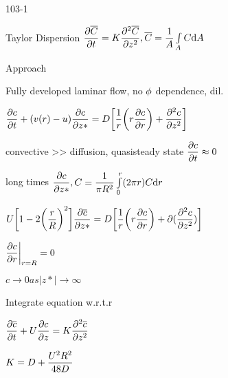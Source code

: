 \begin{mitframe}{103-1}
\begin{listone}
\item Taylor Dispersion  $\dfrac{\partial\overline{\conc}}{\partial\timet}=\dilfac\dfrac{\partial^2\overline{\conc}}{\partial{z}^2}, \overline{\conc}=\dfrac{1}{\helmholtz}\int\limits_{\helmholtz}\conc\mathrm{d}\helmholtz$
\item Approach
		\begin{listtwo}
        	\item Fully developed laminar flow, no $\eleccoeff$ dependence, dil.
            \item $\dfrac{\partial{c}}{\partial\timet}+(\vvel(\pos)-\forcepot)\dfrac{\partial{c}}{\partial{z}*}=\elecdisplace\bigg[\dfrac{1}{\pos}\bigg(\pos\dfrac{\partial{c}}{\partial\pos}\bigg)+\dfrac{\partial^2c}{\partial{z}^2}\bigg]$
            \item convective >> diffusion, quasisteady state $\dfrac{\partial{c}}{\partial\timet}\approx{0}$
            \item long times $\dfrac{\partial{c}}{\partial{z}*}, \conc=\dfrac{1}{\pi\gasconst^2}\int\limits_{\init}^{\pos}(2\pi\pos)\conc\mathrm{d}\pos$
            \item $\uvel\bigg[1-2\bigg(\dfrac{\pos}{\gasconst}\bigg)^2\bigg]\dfrac{\partial\overline{c}}{\partial{z}*}=\elecdisplace\bigg[\dfrac{1}{\pos}\bigg(\pos\dfrac{\partial{c}}{\partial{\pos}}\bigg)+\partial(\dfrac{\partial^2{c}}{\partial{z^2}})\bigg]$
            \item $\dfrac{\partial{c}}{\partial\pos}\bigg|_{\pos=\gasconst}=0$
            \item$c\rightarrow{0} as |z*|\rightarrow\infty$
            \item Integrate equation w.r.t.r
            \item $\dfrac{\partial\overline{c}}{\partial\timet}+\uvel\dfrac{\partial{c}}{\partial{z}}=\dilfac\dfrac{\partial^2\overline{c}}{\partial{z^2}}$
            \item $\dilfac=\elecdisplace+\dfrac{\uvel^2\gasconst^2}{48\elecdisplace}$
            \end{listtwo}
\end{listone}        
\end{mitframe}